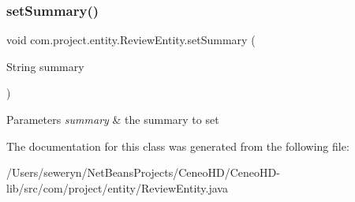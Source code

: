 \subsubsection{set\+Summary()}
{\footnotesize\ttfamily void com.\+project.\+entity.\+Review\+Entity.\+set\+Summary (\begin{DoxyParamCaption}\item[{String}]{summary }\end{DoxyParamCaption})}


\begin{DoxyParams}{Parameters}
{\em summary} & the summary to set \\
\hline
\end{DoxyParams}


The documentation for this class was generated from the following file\+:\begin{DoxyCompactItemize}
\item 
/\+Users/seweryn/\+Net\+Beans\+Projects/\+Ceneo\+H\+D/\+Ceneo\+H\+D-\/lib/src/com/project/entity/Review\+Entity.\+java\end{DoxyCompactItemize}

